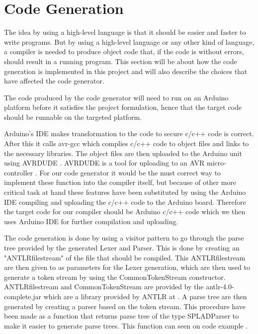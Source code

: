 \section{Code Generation}
The idea by using a high-level language is that it should be easier and faster to write programs. But by using a high-level language or any other kind of language, a compiler is needed to produce object code that, if the code is without errors, should result in a running program. This section will be about how the code generation is implemented in this project and will also describe the choices that have affected the code generator.

The code produced by the code generator will need to run on an Arduino platform before it satisfies the project formulation, hence that the target code should be runnable on the targeted platform.

Arduino's IDE makes transformation to the code to secure c/c++ code is correct. After this it calls avr-gcc which complies c/c++ code to object files and links to the necessary libraries. The object files are then uploaded to the Arduino unit using AVRDUDE \citep{Buildproc}. AVRDUDE is a tool for uploading to an AVR micro-controller \citep{AVRDUDE}. For our code generator it would be the must correct way to implement these function into the compiler itself, but because of other more critical task at hand these features have been substituted by using the Arduino IDE compiling and uploading the c/c++ code to the Arduino board. Therefore the target code for our compiler should be Arduino c/c++ code which we then uses Arduino IDE for further compilation and uploading.

The code generation is done by using a visitor pattern to go through the parse tree provided by the generated Lexer and Parser. This is done by creating an "ANTLRfilestream" of the file that should be compiled. This ANTLRfilestream are then given to as parameters for the Lexer generation, which are then used to generate a token stream by using the CommonTokenStream constructor. ANTLRfilestream and CommonTokenStream are provided by the antlr-4.0-complete.jar which are a library provided by ANTLR at \citep{DownloadANTLR}. A parse tree are then generated by creating a parser based on the token stream. This procedure have been made as a function that returns parse tree of the type SPLADParser to make it easier to generate parse trees. This function can seen on code example .

